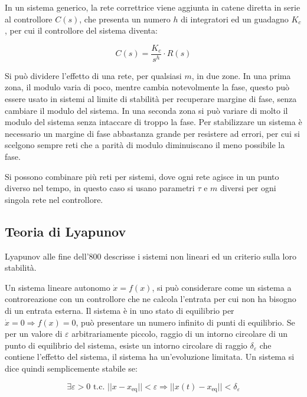 \documentclass{article}
\numberwithin{equation}{subsection}
\begin{document}
In un sistema generico, la rete correttrice viene aggiunta in catene diretta in serie al controllore $C(s)$, che presenta un numero $h$ di integratori ed un guadagno $K_c$, 
per cui il controllore del sistema diventa: 

\begin{equation*}
    C(s)=\displaystyle\frac{K_c}{s^h}\cdot R(s)
\end{equation*}

Si può dividere l'effetto di una rete, per qualsiasi $m$, in due zone. In una prima zona, il modulo varia di poco, mentre cambia notevolmente la fase, questo può essere 
usato in sistemi al limite di stabilità per recuperare margine di fase, senza cambiare il modulo del sistema. In una seconda zona si può variare di molto il modulo del 
sistema senza intaccare di troppo la fase. Per stabilizzare un sistema è necessario un margine di fase abbastanza grande per resistere ad errori, per cui si scelgono sempre 
reti che a parità di modulo diminuiscano il meno possibile la fase. 


Si possono combinare più reti per sistemi, dove ogni rete agisce in un punto diverso nel tempo, in questo caso si usano parametri $\tau$ e $m$ diversi per ogni singola 
rete nel controllore. 

\subsection{Teoria di Lyapunov}

Lyapunov alle fine dell'$800$ descrisse i sistemi non lineari ed un criterio sulla loro stabilità. 


Un sistema lineare autonomo $\dot x=f(x)$, si può considerare come un 
sistema a controreazione con un controllore che ne calcola l'entrata per cui non ha bisogno di un entrata esterna. Il sistema è in uno stato di equilibrio per 
$\dot x=0\Rightarrow f(x)=0$, può presentare un numero infinito di punti di equilibrio. Se per un valore di $\varepsilon$ arbitrariamente piccolo, raggio di un intorno 
circolare di un punto di equilibrio del sistema, esiste un intorno circolare di raggio $\delta_{\varepsilon}$ che contiene l'effetto del sistema, il sistema ha un'evoluzione 
limitata. Un sistema si dice quindi semplicemente stabile se:

\begin{equation*}
    \exists\varepsilon>0\mbox{ t.c. }||x-x_\mathrm{eq}||<\varepsilon\Rightarrow||x(t)-x_\mathrm{eq}||<\delta_{\varepsilon}
\end{equation*}
\end{document}
